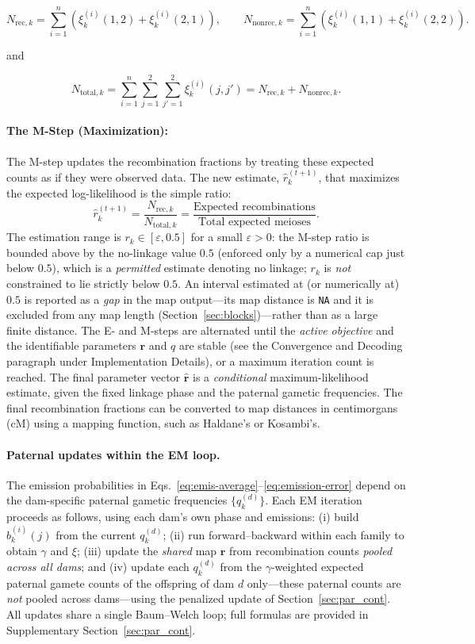 \documentclass[11pt]{article}
\begin{document}
\[
    N_{\text{rec},k} = \sum_{i=1}^{n} \left( \xi_k^{(i)}(1,2) + \xi_k^{(i)}(2,1) \right),
    \qquad
    N_{\text{nonrec},k} = \sum_{i=1}^{n} \left( \xi_k^{(i)}(1,1) + \xi_k^{(i)}(2,2) \right).
\]

and 

\[
N_{\text{total},k}
= \sum_{i=1}^{n}\sum_{j=1}^{2}\sum_{j'=1}^{2} \xi_k^{(i)}(j,j')
= N_{\text{rec},k}+N_{\text{nonrec},k}.
\]

\paragraph{The M-Step (Maximization):}
The M-step updates the recombination fractions by treating these expected counts as if they were observed data. The new estimate, $\hat{r}_k^{(t+1)}$, that maximizes the expected log-likelihood is the simple ratio:
\begin{equation}
    \hat{r}_k^{(t+1)} = \frac{N_{\text{rec},k}}{N_{\text{total},k}} = \frac{\text{Expected recombinations}}{\text{Total expected meioses}}.
\end{equation}
The estimation range is $r_k\in[\varepsilon,0.5]$ for a small $\varepsilon>0$: the M-step ratio is bounded above by the no-linkage value $0.5$ (enforced only by a numerical cap just below $0.5$), which is a \emph{permitted} estimate denoting no linkage; $r_k$ is \emph{not} constrained to lie strictly below $0.5$. An interval estimated at (or numerically at) $0.5$ is reported as a \emph{gap} in the map output---its map distance is \texttt{NA} and it is excluded from any map length (Section~\ref{sec:blocks})---rather than as a large finite distance. The E- and M-steps are alternated until the \emph{active objective} and the identifiable parameters $\mathbf r$ and $q$ are stable (see the Convergence and Decoding paragraph under Implementation Details), or a maximum iteration count is reached. The final parameter vector $\hat{\mathbf{r}}$ is a \emph{conditional} maximum-likelihood estimate, given the fixed linkage phase and the paternal gametic frequencies. The final recombination fractions can be converted to map distances in centimorgans (cM) using a mapping function, such as Haldane's or Kosambi's.
\paragraph{Paternal updates within the EM loop.}
The emission probabilities in Eqs.~\eqref{eq:emis-average}–\eqref{eq:emission-error} depend on the
dam-specific paternal gametic frequencies $\{q_k^{(d)}\}$. Each EM iteration proceeds as follows,
using each dam's own phase and emissions: (i) build $b_k^{(i)}(j)$ from the current $q_k^{(d)}$;
(ii) run forward--backward within each family to obtain $\gamma$ and $\xi$; (iii) update the
\emph{shared} map $\mathbf r$ from recombination counts \emph{pooled across all dams}; and (iv)
update each $q_k^{(d)}$ from the $\gamma$-weighted expected paternal gamete counts of the offspring
of dam $d$ only---these paternal counts are \emph{not} pooled across dams---using the penalized
update of Section~\ref{sec:par_cont}. All updates share a single Baum--Welch loop; full formulas are
provided in Supplementary Section~\ref{sec:par_cont}.
\end{document}
